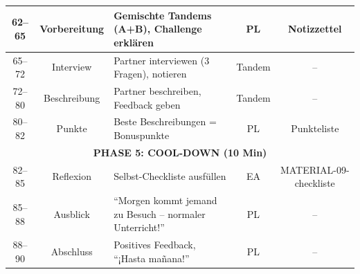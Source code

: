 \documentclass[11pt, a4paper]{article}
\begin{document}
\begin{tabularx}{\textwidth}{|c|c|X|c|c|}
\hline
62--65 & Vorbereitung & Gemischte Tandems (A+B), Challenge erklären & PL & Notizzettel \\
\hline
65--72 & Interview & Partner interviewen (3 Fragen), notieren & Tandem & -- \\
\hline
72--80 & Beschreibung & Partner beschreiben, Feedback geben & Tandem & -- \\
\hline
80--82 & Punkte & Beste Beschreibungen = Bonuspunkte & PL & Punkteliste \\
\hline
\multicolumn{5}{|c|}{\cellcolor{hellgrau}\textbf{PHASE 5: COOL-DOWN (10 Min)}} \\
\hline
82--85 & Reflexion & Selbst-Checkliste ausfüllen & EA & MATERIAL-09-checkliste \\
\hline
85--88 & Ausblick & ``Morgen kommt jemand zu Besuch -- normaler Unterricht!'' & PL & -- \\
\hline
88--90 & Abschluss & Positives Feedback, ``¡Hasta mañana!'' & PL & -- \\
\hline
\end{tabularx}

\normalsize
\vspace{0.2cm}

\end{document}
